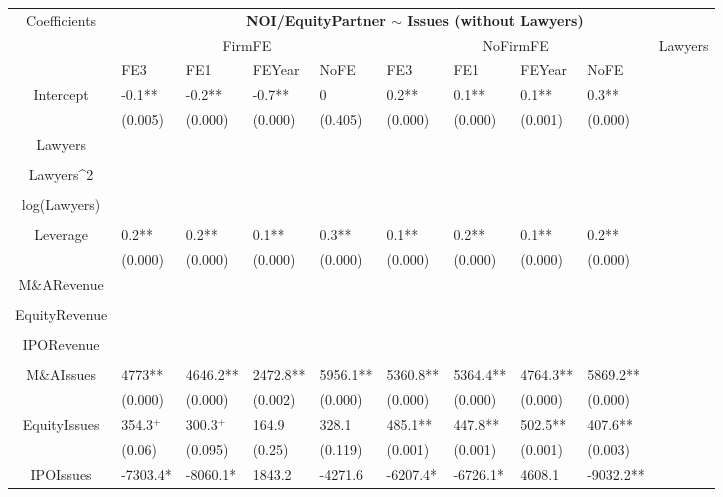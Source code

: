 \documentclass{article}
\begin{document}
\begin{table}[H]
\centering
\begin{tabular}{|clllllllll|}
\hline
\multirow{3}{*}{Coefficients} & \multicolumn{9}{c|}{\textbf{NOI/EquityPartner $\sim$ Issues (without Lawyers)}} \\
\cline{2-10}
& \multicolumn{4}{c}{FirmFE} & \multicolumn{4}{c}{NoFirmFE} & \multirow{2}{*}{Lawyers} \\
\cline{2-9}
& FE3 & FE1 & FEYear & NoFE & FE3 & FE1 & FEYear & NoFE &  \\
\hline
 
Intercept & -0.1** & -0.2** & -0.7** & 0 & 0.2** & 0.1** & 0.1** & 0.3** & \\ 
   & (0.005) & (0.000) & (0.000) & (0.405) & (0.000) & (0.000) & (0.001) & (0.000) & \\ 
  Lawyers &  &  &  &  &  &  &  &  & \\ 
   &  &  &  &  &  &  &  &  & \\ 
  Lawyers^2 &  &  &  &  &  &  &  &  & \\ 
   &  &  &  &  &  &  &  &  & \\ 
  log(Lawyers) &  &  &  &  &  &  &  &  & \\ 
   &  &  &  &  &  &  &  &  & \\ 
  Leverage & 0.2** & 0.2** & 0.1** & 0.3** & 0.1** & 0.2** & 0.1** & 0.2** & \\ 
   & (0.000) & (0.000) & (0.000) & (0.000) & (0.000) & (0.000) & (0.000) & (0.000) & \\ 
  M\&ARevenue &  &  &  &  &  &  &  &  & \\ 
   &  &  &  &  &  &  &  &  & \\ 
  EquityRevenue &  &  &  &  &  &  &  &  & \\ 
   &  &  &  &  &  &  &  &  & \\ 
  IPORevenue &  &  &  &  &  &  &  &  & \\ 
   &  &  &  &  &  &  &  &  & \\ 
  M\&AIssues & 4773** & 4646.2** & 2472.8** & 5956.1** & 5360.8** & 5364.4** & 4764.3** & 5869.2** & \\ 
   & (0.000) & (0.000) & (0.002) & (0.000) & (0.000) & (0.000) & (0.000) & (0.000) & \\ 
  EquityIssues & 354.3$^{+}$ & 300.3$^{+}$ & 164.9 & 328.1 & 485.1** & 447.8** & 502.5** & 407.6** & \\ 
   & (0.06) & (0.095) & (0.25) & (0.119) & (0.001) & (0.001) & (0.001) & (0.003) & \\ 
  IPOIssues & -7303.4* & -8060.1* & 1843.2 & -4271.6 & -6207.4* & -6726.1* & 4608.1 & -9032.2** & \\ 

\end{tabular}
\end{table}
\end{document}
